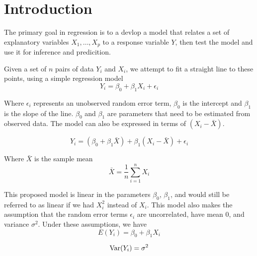 \chapter{Introduction} 

The primary goal in regression is to a devlop a model that relates a set of explanatory variables $X_1, \ldots, X_p$ to a response variable $Y$, then test the model and use it for inference and predicition. 

Given a set of $n$ pairs of data $Y_i$ and $X_i$, we attempt to fit a straight line to these points, using a simple regression model 
\[Y_i = \beta_0 + \beta_1X_i + \epsilon_i\]

Where $\epsilon_i$ represents an unobserved random error term, $\beta_0$ is the intercept and $\beta_1$ is the slope of the line. $\beta_0$ and $\beta_1$ are parameters that need to be estimated from observed data. The model can also be expressed in terms of $(X_i - \bar{X})$.

\[Y_i = (\beta_0 + \beta_1\bar{X}) + \beta_1(X_i - \bar{X}) + \epsilon_i\]

Where $\bar{X}$ is the sample mean 
\[\bar{X} = \frac{1}{n}\sum_{i=1}^n  X_i \]

This proposed model is linear in the parameters $\beta_0$, $\beta_1$, and would still be referred to as linear if we had $X_i^2$ instead of $X_i$. This model also makes the assumption that the random error terms $\epsilon_i$ are uncorrelated, have mean 0, and variance $\sigma^2$. Under these assumptions, we have 
\[E(Y_i) = \beta_0 + \beta_1 X_i\]

\[\operatorname{Var}(Y_i) = \sigma^2\]

